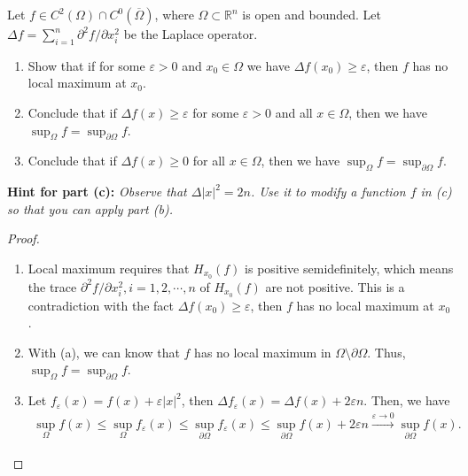 \documentclass[11pt]{article}
\theoremstyle{definition}
\numberwithin{equation}{subsection}
\begin{document}
Let $f \in C^2(\Omega) \cap C^0(\overline{\Omega})$, where $\Omega \subset \mathbb{R}^n$ is open and bounded.
Let $\Delta f = \sum_{i=1}^n \partial^2f/\partial x_i^2$ be the Laplace operator.
\begin{enumerate}
    \item[(a)] Show that if for some $\varepsilon > 0$ and $x_0 \in \Omega$ we have $\Delta f(x_0) \geq \varepsilon$, then $f$ has no local maximum at $x_0$.
    
    \item[(b)] Conclude that if $\Delta f(x) \geq \varepsilon$ for some $\varepsilon > 0$ and all $x \in \Omega$, then we have $\sup_{\Omega} f = \sup_{\partial \Omega} f$.
    
    \item[(c)] Conclude that if $\Delta f(x) \geq 0$ for all $x \in \Omega$, then we have $\sup_{\Omega} f = \sup_{\partial \Omega} f$.
\end{enumerate}
{\bf Hint for part (c):} {\em Observe that $\Delta |x|^2 = 2n$. Use it to modify a function $f$ in (c) so that you can apply part (b).}
\begin{proof}
~\begin{enumerate}
    \item[(a)] Local maximum requires that $H_{x_0}(f)$ is positive semidefinitely, which means the trace $\partial^2f/\partial x_i^2, i = 1,2,\cdots,n$ of $H_{x_0}(f)$ are not positive. This is a contradiction with the fact $\Delta f(x_0) \geq \varepsilon$, then $f$ has no local maximum at $x_0$.
    
    \item[(b)] With (a), we can know that $f$ has no local maximum in $\Omega \setminus \partial \Omega$. Thus, $\sup_{\Omega} f = \sup_{\partial \Omega} f$.
    
    \item[(c)] Let $f_\varepsilon(x) = f(x) + \varepsilon |x|^2$, then $\Delta f_\varepsilon(x) = \Delta f(x) + 2 \varepsilon n$. Then, we have
    \begin{align*}
        \sup_{\Omega} f(x) \leq \sup_{\Omega} f_\varepsilon(x) \leq \sup_{\partial\Omega} f_\varepsilon(x) \leq \sup_{\partial \Omega} f(x) + 2 \varepsilon n \xrightarrow{\varepsilon \to 0} \sup_{\partial \Omega} f(x).
    \end{align*}
\end{enumerate}
\end{proof}

\medskip
\end{document}
